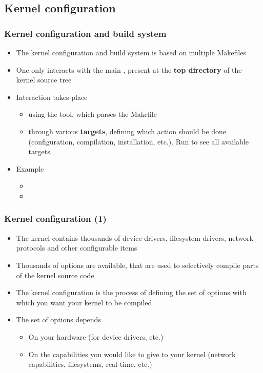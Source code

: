 \subsection{Kernel configuration}

\begin{frame}
  \frametitle{Kernel configuration and build system}
  \begin{itemize}
  \item The kernel configuration and build system is based on multiple
    Makefiles
  \item One only interacts with the main , present at
    the {\bf top directory} of the kernel source tree
  \item Interaction takes place
    \begin{itemize}
    \item using the  tool, which parses the Makefile
    \item through various {\bf targets}, defining which action should
      be done (configuration, compilation, installation, etc.). Run
       to see all available targets.
    \end{itemize}
  \item Example
    \begin{itemize}
    \item {}
    \item {}
    \end{itemize}
  \end{itemize}
\end{frame}

\begin{frame}
  \frametitle{Kernel configuration (1)}
  \begin{itemize}
  \item The kernel contains thousands of device drivers, filesystem
    drivers, network protocols and other configurable items
  \item Thousands of options are available, that are used to
    selectively compile parts of the kernel source code
  \item The kernel configuration is the process of defining the set of
    options with which you want your kernel to be compiled
  \item The set of options depends
    \begin{itemize}
    \item On your hardware (for device drivers, etc.)
    \item On the capabilities you would like to give to your kernel
      (network capabilities, filesystems, real-time, etc.)
    \end{itemize}
  \end{itemize}
\end{frame}

